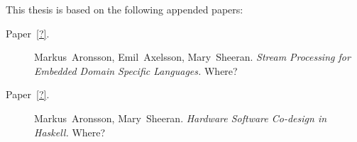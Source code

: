 
\begin{refsection}

This thesis is based on the following appended papers:

\begin{description}
\item[Paper~\ref{?}.] Markus~Aronsson, Emil~Axelsson, Mary~Sheeran. \emph{Stream Processing for Embedded Domain Specific Languages.} Where?

\item[Paper~\ref{?}.] Markus~Aronsson, Mary~Sheeran. \emph{Hardware Software Co-design in Haskell.} Where?
\end{description}

\end{refsection}
